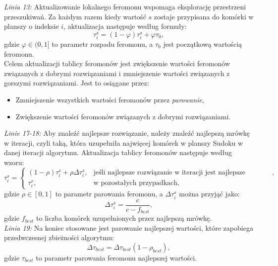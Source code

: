 \documentclass[11pt]{scrartcl} %
\begin{document}
\textit{Linia 13:} Aktualizowanie lokalnego feromonu wspomaga eksplorację przestrzeni przeszukiwań. Za każdym razem kiedy wartość $s$ zostaje przypisana do komórki w planszy o indeksie $i$, aktualizacja następuje według formuły:
\begin{equation}
\tau_i^s = (1 - \varphi)\tau_i^s + \varphi\tau_0,
\end{equation}
gdzie $\varphi \in (0,1]$ to parametr rozpadu feromonu, a $\tau_0$ jest początkową wartością feromonu.\\


Celem aktualizacji tablicy feromonów jest zwiększenie wartości feromonów związanych z dobrymi rozwiązaniami i zmniejszenie wartości związanych z gorszymi rozwiązaniami. Jest to osiągane przez:
\begin{itemize}
	\item Zmniejszenie wszystkich wartości feromonów przez \textit{parowanie}, 
	\item Zwiększenie wartości feromonów związanych z dobrymi rozwiązaniami.
\end{itemize}

\textit{Linie 17-18:} Aby znaleźć najlepsze rozwiązanie, należy znaleźć najlepszą mrówkę w iteracji, czyli taką, która uzupełniła najwięcej komórek w planszy Sudoku w danej iteracji algorytmu. Aktualizacja tablicy feromonów następuje według wzoru:
\begin{equation}
\tau_i^s = \begin{cases}
(1-\rho)\tau_i^s+\rho\Delta\tau_i^s, & \text{jeśli najlepsze rozwiązanie w iteracji jest najlepsze globalnie},\\
\tau_i^s, & \text{w pozostałych przypadkach,}
\end{cases}
\end{equation}
gdzie $\rho \in [0,1]$ to parametr parowania feromonu, a $\Delta\tau_i^s$ można przyjąć jako:
\begin{equation}
\Delta\tau_i^s = \dfrac{c}{c-f_{best}},
\end{equation}
gdzie $f_{best}$ to liczba komórek uzupełnionych przez najlepszą mrówkę.\\

\textit{Linia 19:} Na koniec stosowane jest parowanie najlepszej wartości, które zapobiega przedwczesnej zbieżności algorytmu:
\begin{equation}
\Delta\tau_{best} = \Delta\tau_{best}(1-\rho_{best}),
\end{equation}
gdzie $\tau_{best}$ to parametr parowania feromonu najlepszej wartości.\\
\end{document}

